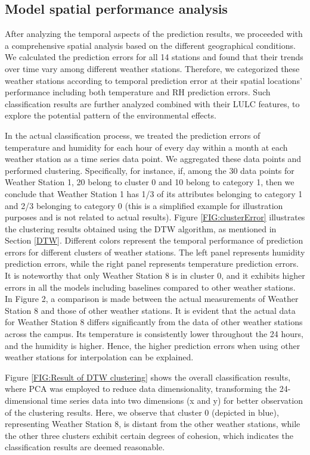 \documentclass[a4paper,fleqn]{cas-sc}
\begin{document}
\subsection{Model spatial performance analysis}

After analyzing the temporal aspects of the prediction results, we proceeded with a comprehensive spatial analysis based on the different geographical conditions. We calculated the prediction errors for all 14 stations and found that their trends over time vary among different weather stations. Therefore, we categorized these weather stations according to temporal prediction error at their spatial locations' performance including both temperature and RH prediction errors. Such classification results are further analyzed combined with their LULC features, to explore the potential pattern of the environmental effects. 


In the actual classification process, we treated the prediction errors of temperature and humidity for each hour of every day within a month at each weather station as a time series data point. We aggregated these data points and performed clustering. Specifically, for instance, if, among the 30 data points for Weather Station 1, 20 belong to cluster 0 and 10 belong to category 1, then we conclude that Weather Station 1 has 1/3 of its attributes belonging to category 1 and 2/3 belonging to category 0 (this is a simplified example for illustration purposes and is not related to actual results). Figure \ref{FIG:clusterError} illustrates the clustering results obtained using the DTW algorithm, as mentioned in Section \ref{DTW}. Different colors represent the temporal performance of prediction errors for different clusters of weather stations. The left panel represents humidity prediction errors, while the right panel represents temperature prediction errors. It is noteworthy that only Weather Station 8 is in cluster 0, and it exhibits higher errors in all the models including baselines compared to other weather stations. In Figure 2, a comparison is made between the actual measurements of Weather Station 8 and those of other weather stations. It is evident that the actual data for Weather Station 8 differs significantly from the data of other weather stations across the campus. Its temperature is consistently lower throughout the 24 hours, and the humidity is higher. Hence, the higher prediction errors when using other weather stations for interpolation can be explained. 

Figure \ref{FIG:Result of DTW clustering} shows the overall classification results, where PCA was employed to reduce data dimensionality, transforming the 24-dimensional time series data into two dimensions (x and y) for better observation of the clustering results. Here, we observe that cluster 0 (depicted in blue), representing Weather Station 8, is distant from the other weather stations, while the other three clusters exhibit certain degrees of cohesion, which indicates the classification results are deemed reasonable.
\end{document}
